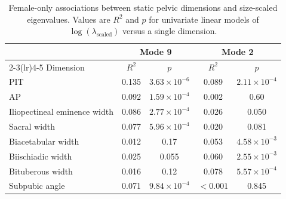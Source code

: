 \documentclass[openacc]{rsproca_new}
\begin{document}
\begin{table}[p]
\centering
\caption{Female-only associations between static pelvic dimensions and size-scaled eigenvalues. Values are $R^2$ and $p$ for univariate linear models of $\log(\lambda_{\mathrm{scaled}})$ versus a single dimension.}
\label{tab:staticassoc}
\begin{tabular}{lcccc}
\toprule
& \multicolumn{2}{c}{Mode 9} & \multicolumn{2}{c}{Mode 2} \\
\cmidrule(lr){2-3}\cmidrule(lr){4-5}
Dimension & $R^2$ & $p$ & $R^2$ & $p$ \\
\midrule
PIT & 0.135 & $3.63 \times 10^{-6}$ & 0.089 & $2.11 \times 10^{-4}$ \\
AP & 0.092 & $1.59 \times 10^{-4}$ & 0.002 & 0.60 \\
Iliopectineal eminence width & 0.086 & $2.77 \times 10^{-4}$ & 0.026 & 0.050 \\
Sacral width & 0.077 & $5.96 \times 10^{-4}$ & 0.020 & 0.081 \\
Biacetabular width & 0.012 & 0.17 & 0.053 & $4.58 \times 10^{-3}$ \\
Biischiadic width & 0.025 & 0.055 & 0.060 & $2.55 \times 10^{-3}$ \\
Bituberous width & 0.016 & 0.12 & 0.078 & $5.57 \times 10^{-4}$ \\
Subpubic angle & 0.071 & $9.84 \times 10^{-4}$ & $<0.001$ & 0.845 \\
\bottomrule
\end{tabular}
\end{table}
\end{document}
